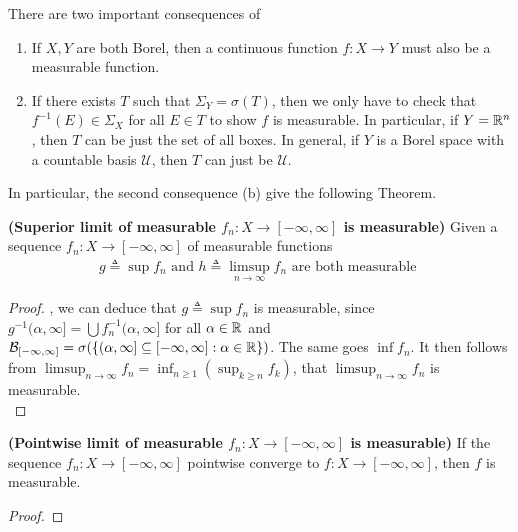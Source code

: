 \documentclass{report}
\begin{document}
\begin{mdframed}
There are two important consequences of 
\begin{enumerate}[label=(\alph*)]
  \item If $X,Y$ are both Borel, then a continuous function  $f:X\rightarrow Y$ must also be a measurable function. 
  \item If there exists $T$ such that  $\Sigma_Y=\sigma (T)$, then we only have to check that $f^{-1}(E)\in \Sigma_X$ for all $E \in T$ to show $f$ is measurable. In particular, if $Y=\mathbb{R}^n$, then  $T$ can be just the set of all boxes. In general, if $Y$ is a Borel space with a countable basis $\mathcal{U}$, then $T$ can just be $\mathcal{U}$.
\end{enumerate}
In particular, the second consequence (b) give the following Theorem. 
\end{mdframed}
\begin{theorem}
\textbf{(Superior limit of measurable $f_n:X\rightarrow [-\infty,\infty]$ is measurable)} Given a sequence $f_n:X\rightarrow [-\infty, \infty]$ of measurable functions
\begin{align*}
g\triangleq \sup f_n \text{ and }h\triangleq \limsup_{n\to\infty} f_n\text{ are both measurable }
\end{align*}





\end{theorem}
\begin{proof}

, we can deduce that $g\triangleq \sup f_n$ is measurable, since $g^{-1}(\alpha ,\infty]=\bigcup f^{-1}_n (\alpha ,\infty]$ for all $\alpha\in\mathbb{R}$ and  $\mathcal{B}_{[-\infty,\infty]}=\sigma (\{ (\alpha , \infty]\subseteq [-\infty,\infty]:\alpha \in\mathbb{R} \})$. The same goes $\inf f_n$. It then follows from $\limsup_{n\to\infty} f_n= \inf_{n\geq 1} (\sup_{k\geq n}f_k)$, that $\limsup_{n\to\infty} f_n$ is measurable.\\

\end{proof}
\begin{corollary}
\textbf{(Pointwise limit of measurable $f_n:X\rightarrow [-\infty,\infty]$ is measurable)} If the sequence $f_n:X\rightarrow [-\infty,\infty]$ pointwise converge to $f:X\rightarrow [-\infty,\infty]$,  then $f$ is measurable. 
\end{corollary}
\begin{proof}

\end{proof}
\end{document}
